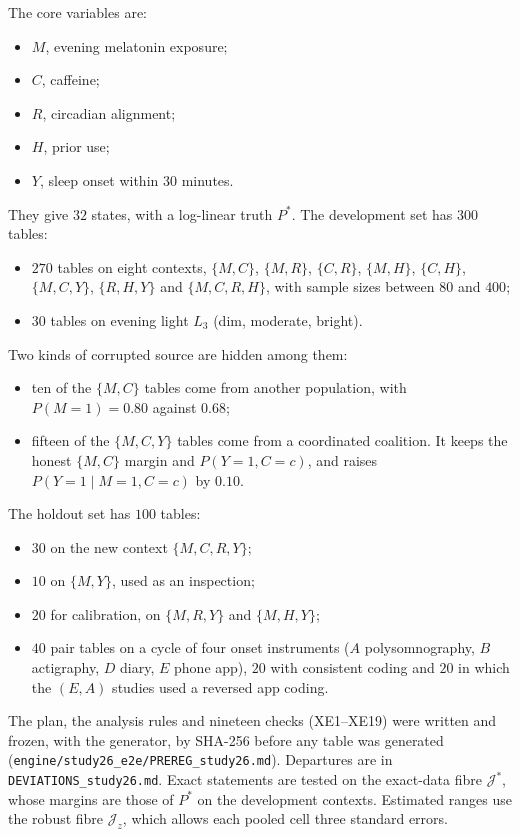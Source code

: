 \documentclass[11pt]{article}
\theoremstyle{definition}\newtheorem{definition}[theorem]{Definition}\newtheorem{remark}[theorem]{Remark}\newtheorem{example}[theorem]{Example}\newtheorem{problem}[theorem]{Open problem}\crefname{problem}{Problem}{Problems}
\begin{document}
The core variables are:
\begin{itemize}
\item $M$, evening melatonin exposure;
\item $C$, caffeine;
\item $R$, circadian alignment;
\item $H$, prior use;
\item $Y$, sleep onset within $30$ minutes.
\end{itemize}
They give $32$ states, with a log-linear truth $P^\ast$. The development set has $300$ tables:
\begin{itemize}
\item $270$ tables on eight contexts, $\{M,C\}$, $\{M,R\}$, $\{C,R\}$, $\{M,H\}$, $\{C,H\}$, $\{M,C,Y\}$, $\{R,H,Y\}$ and $\{M,C,R,H\}$, with sample sizes between $80$ and $400$;
\item $30$ tables on evening light $L_3$ (dim, moderate, bright).
\end{itemize}
Two kinds of corrupted source are hidden among them:
\begin{itemize}
\item ten of the $\{M,C\}$ tables come from another population, with $P(M{=}1)=0.80$ against $0.68$;
\item fifteen of the $\{M,C,Y\}$ tables come from a coordinated coalition. It keeps the honest $\{M,C\}$ margin and $P(Y{=}1,C{=}c)$, and raises $P(Y{=}1\mid M{=}1,C{=}c)$ by $0.10$.
\end{itemize}
The holdout set has $100$ tables:
\begin{itemize}
\item $30$ on the new context $\{M,C,R,Y\}$;
\item $10$ on $\{M,Y\}$, used as an inspection;
\item $20$ for calibration, on $\{M,R,Y\}$ and $\{M,H,Y\}$;
\item $40$ pair tables on a cycle of four onset instruments ($A$ polysomnography, $B$ actigraphy, $D$ diary, $E$ phone app), $20$ with consistent coding and $20$ in which the $(E,A)$ studies used a reversed app coding.
\end{itemize}

The plan, the analysis rules and nineteen checks (XE1--XE19) were written and frozen, with the generator, by SHA-256 before any table was generated (\texttt{engine/study26\_e2e/PREREG\_study26.md}). Departures are in \texttt{DEVIATIONS\_study26.md}. Exact statements are tested on the exact-data fibre $\mathcal J^\ast$, whose margins are those of $P^\ast$ on the development contexts. Estimated ranges use the robust fibre $\mathcal J_z$, which allows each pooled cell three standard errors.
\end{document}
